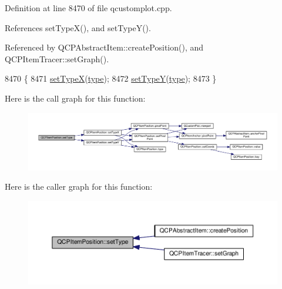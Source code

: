 Definition at line 8470 of file qcustomplot.\+cpp.



References set\+Type\+X(), and set\+Type\+Y().



Referenced by Q\+C\+P\+Abstract\+Item\+::create\+Position(), and Q\+C\+P\+Item\+Tracer\+::set\+Graph().


\begin{DoxyCode}
8470                                                               \{
8471   \hyperlink{class_q_c_p_item_position_a2113b2351d6d00457fb3559a4e20c3ea}{setTypeX}(\hyperlink{class_q_c_p_item_position_aecb709d72c9aa334a7f62e2c9e0b5d60}{type});
8472   \hyperlink{class_q_c_p_item_position_ac2a454aa5a54c1615c50686601ec4510}{setTypeY}(\hyperlink{class_q_c_p_item_position_aecb709d72c9aa334a7f62e2c9e0b5d60}{type});
8473 \}
\end{DoxyCode}


Here is the call graph for this function\+:\nopagebreak
\begin{figure}[H]
\begin{center}
\leavevmode
\includegraphics[width=350pt]{class_q_c_p_item_position_aa476abf71ed8fa4c537457ebb1a754ad_cgraph}
\end{center}
\end{figure}




Here is the caller graph for this function\+:\nopagebreak
\begin{figure}[H]
\begin{center}
\leavevmode
\includegraphics[width=350pt]{class_q_c_p_item_position_aa476abf71ed8fa4c537457ebb1a754ad_icgraph}
\end{center}
\end{figure}


